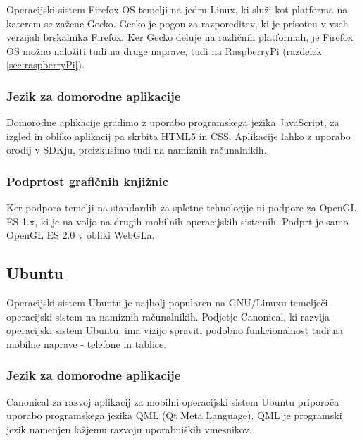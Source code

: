 Operacijski sistem Firefox OS temelji na jedru Linux, ki služi kot platforma na katerem se zažene Gecko. Gecko je pogon za razporeditev, ki je prisoten v vseh verzijah brskalnika Firefox. Ker Gecko deluje na različnih platformah, je Firefox OS možno naložiti tudi na druge naprave, tudi na RaspberryPi (razdelek \ref{sec:raspberryPi}). 

\subsubsection{Jezik za domorodne aplikacije}

Domorodne aplikacije gradimo z uporabo programskega jezika JavaScript, za izgled in obliko aplikacij pa skrbita HTML5 in CSS. Aplikacije lahko z uporabo orodij v SDKju, preizkusimo tudi na namiznih računalnikih.

\subsubsection{Podprtost grafičnih knjižnic}

Ker podpora temelji na standardih za spletne tehnologije ni podpore za OpenGL ES 1.x, ki je na voljo na drugih mobilnih operacijskih sistemih. Podprt je samo OpenGL ES 2.0 v obliki WebGLa.

\subsection{Ubuntu}

Operacijski sistem Ubuntu \cite{ubuntu} je najbolj popularen na GNU/Linuxu temelječi operacijski sistem na namiznih računalnikih. Podjetje Canonical, ki razvija operacijski sistem Ubuntu, ima vizijo spraviti podobno funkcionalnost tudi na mobilne naprave - telefone in tablice. %


\subsubsection{Jezik za domorodne aplikacije}

Canonical za razvoj aplikacij za mobilni operacijski sistem Ubuntu priporoča uporabo programskega jezika QML (Qt Meta Language). QML je programski jezik namenjen lažjemu razvoju uporabniških vmesnikov. 

